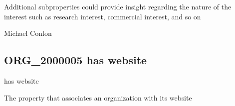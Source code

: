 \documentclass[letterpaper,10pt,english]{sphinxmanual}
\begin{document}
\begin{sphinxShadowBox}

\sphinxAtStartPar
Additional subproperties could provide insight regarding the nature of the interest such as research interest, commercial interest, and so on
\end{sphinxShadowBox}

\begin{sphinxShadowBox}

\sphinxAtStartPar
{}
\end{sphinxShadowBox}

\begin{sphinxShadowBox}

\sphinxAtStartPar
Michael Conlon 
\end{sphinxShadowBox}
\begin{quote}

\ignorespaces \end{quote}


\subsection{ORG\_2000005 \sphinxhyphen{} has website}
\label{\detokenize{doc-ORG_2000005:org-2000005-has-website}}\label{\detokenize{doc-ORG_2000005:index-0}}\label{\detokenize{doc-ORG_2000005::doc}}
\begin{sphinxShadowBox}

\sphinxAtStartPar
has website
\end{sphinxShadowBox}

\begin{sphinxShadowBox}

\sphinxAtStartPar
{}
\end{sphinxShadowBox}

\begin{sphinxShadowBox}

\sphinxAtStartPar
The property that associates an organization with its website
\end{sphinxShadowBox}
\end{document}
